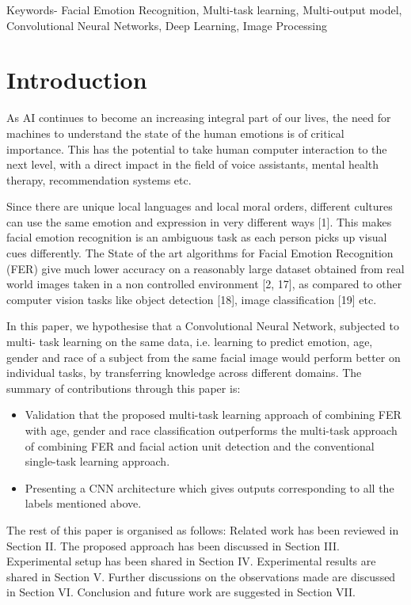 \documentclass[letterpaper,10pt]{article}
\begin{document}
Keywords- Facial Emotion Recognition, Multi-task learning, Multi-output model, Convolutional Neural Networks, Deep Learning, Image Processing



\section{Introduction}
As AI continues to become an increasing integral part of our lives, the need for
machines to understand the state of the human emotions is of critical importance. This has the potential to take human computer interaction to the next level, with a direct impact in the field of voice assistants, mental health therapy, recommendation systems etc.

Since there are unique local languages and local moral orders, different cultures can use the same emotion and expression in very different ways [1]. This makes facial emotion recognition is an ambiguous task as each person picks up visual cues differently. The State of the art algorithms for Facial Emotion Recognition (FER) give much lower accuracy on a reasonably large dataset obtained from real world images taken in a non controlled environment [2, 17], as compared to other computer vision tasks like object detection [18], image classification [19] etc.

In this paper, we hypothesise that a Convolutional Neural Network, subjected to multi- task learning on the same data, i.e. learning to predict emotion, age, gender and race of a subject from the same facial image would perform better on individual tasks, by transferring knowledge across different domains.
The summary of contributions through this paper is:
\begin{itemize}
    \item Validation that the proposed multi-task learning approach of combining FER with age, gender and race classification outperforms the multi-task approach of combining FER and facial action unit detection and the conventional single-task learning approach.
    \item Presenting a CNN architecture which gives outputs corresponding to all the labels mentioned above.
\end{itemize}



The rest of this paper is organised as follows: Related work has been reviewed in Section II. The proposed approach has been discussed in Section III. Experimental  setup has been shared in Section IV. Experimental results are shared in Section V. Further discussions on the observations made are discussed in Section VI. Conclusion and future work are suggested in Section VII.
\end{document}
